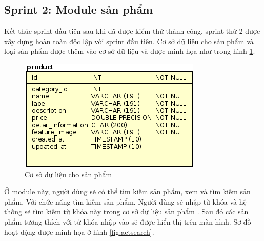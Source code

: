 \documentclass{article}
\begin{document}
\subsection{Sprint 2: Module sản phẩm}

Kết thúc sprint đầu tiên sau khi đã được kiểm thử thành công, sprint thứ 2 được xây dựng hoàn  toàn độc lập với sprint đầu tiên. Cơ sở dữ liệu cho sản phẩm và loại sản phẩm được thêm vào cơ sở dữ liệu và được minh họa như trong hình \ref{fig:dataproduct}. 

\begin{figure}[h]
	\centering
	\includegraphics[scale=0.3]{figures/actproduct.png}
	\caption{Cơ sở dữ liệu cho sản phẩm}
	\label{fig:dataproduct}
\end{figure}

Ở module này, người dùng sẽ có thể tìm kiếm sản phẩm,  xem và tìm kiếm sản phẩm. Với chức năng tìm kiếm sản phẩm. Người dùng sẽ nhập từ khóa và hệ thống sẽ tìm kiếm từ khóa này trong cơ sở dữ liệu sản phẩm . Sau đó các sản phẩm tương thích với từ khóa nhập vào sẽ được hiển thị trên màn hình. Sơ đồ hoạt động được minh họa ở hình \ref{fig:actsearch}. 
\end{document}
